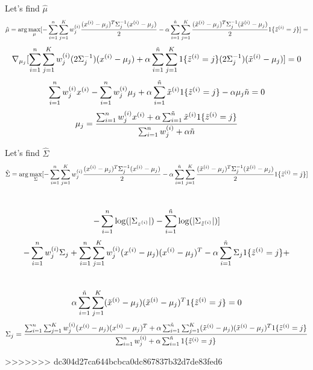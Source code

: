 \begin{answer}
Let's find $\hat{\mu}$
$$\hat{\mu} =  \arg\max_{\mu} [- \sum_{i=1}^{{n}} \sum_{j=1}^{K}  w_j^{(i)} \frac{(x^{(i)} - \mu_j)^T\Sigma_j^{-1}(x^{(i)} - \mu_j)}{2}  - \alpha \sum_{i=1}^{\tilde{{n}}} \sum_{j=1}^{K} \frac{(\tilde{x}^{(i)} - \mu_{j})^T\Sigma_{j}^{-1}(\tilde{x}^{(i)} - \mu_{j})}{2} 1\{\tilde{z}^{(i)}=j\}] = $$
$$\nabla_{\mu_j}[\sum_{i=1}^{{n}} \sum_{j=1}^{K} w_j^{(i)} (2\Sigma_j^{-1}) (x^{(i)} - \mu_j) +\alpha \sum_{i=1}^{\tilde{n}} \sum_{j=1}^{K}  1\{\tilde{z}^{(i)}=j\} (2\Sigma_j^{-1}) (\tilde{x}^{(i)} - \mu_j) ] = 0$$
$$\sum_{i=1}^{{n}} w_j^{(i)} x^{(i)} - \sum_{i=1}^{{n}}  w_j^{(i)} \mu_j +\alpha \sum_{i=1}^{\tilde{n}} \tilde{x}^{(i)} 1\{\tilde{z}^{(i)}=j\}-\alpha \mu_j \tilde{n} = 0$$
$$\mu_j = \frac{\sum_{i=1}^{{n}}  w_j^{(i)} x^{(i)} + \alpha \sum_{i=1}^{\tilde{n}} \tilde{x}^{(i)}1\{\tilde{z}^{(i)}=j\}}{\sum_{i=1}^{{n}} w_j^{(i)} + \alpha \tilde{n}}$$

Let's find $\hat{\Sigma}$
$$\hat{\Sigma} =  \arg\max_{\Sigma} [- \sum_{i=1}^{{n}} \sum_{j=1}^{K}  w_j^{(i)} \frac{(x^{(i)} - \mu_j)^T\Sigma_j^{-1}(x^{(i)} - \mu_j)}{2}  - \alpha \sum_{i=1}^{\tilde{{n}}} \sum_{j=1}^{K} \frac{(\tilde{x}^{(i)} - \mu_{j})^T\Sigma_{j}^{-1}(\tilde{x}^{(i)} - \mu_{j})}{2} 1\{\tilde{z}^{(i)}=j\}]$$ \\
$$ - \sum_{i=1}^{{n}} \log(|\Sigma_{z^{(i)}}|)  - \sum_{i=1}^{\tilde{{n}}} \log(|\Sigma_{\tilde{z}^{(i)}}|)]$$
$$-\sum_{i=1}^{{n}} w_j^{(i)} \Sigma_j + \sum_{i=1}^{{n}} \sum_{j=1}^{K}  w_j^{(i)} (x^{(i)} - \mu_j)(x^{(i)} - \mu_j)^T -  \alpha \sum_{i=1}^{\tilde{{n}}} \Sigma_j 1\{\tilde{z}^{(i)}= j\} +  $$ \\
$$\alpha \sum_{i=1}^{\tilde{{n}}} \sum_{j=1}^{K} (\tilde{x}^{(i)} - \mu_{j})(\tilde{x}^{(i)} - \mu_{j})^T 1\{\tilde{z}^{(i)}=j\}=0$$
$$\Sigma_j = \frac{ \sum_{i=1}^{{n}} \sum_{j=1}^{K}  w_j^{(i)} (x^{(i)} - \mu_j)(x^{(i)} - \mu_j)^T + \alpha \sum_{i=1}^{\tilde{{n}}} \sum_{j=1}^{K} (\tilde{x}^{(i)} - \mu_{j})(\tilde{x}^{(i)} - \mu_{j})^T 1\{\tilde{z}^{(i)}=j\}}{\sum_{i=1}^{{n}} w_j^{(i)} + \alpha \sum_{i=1}^{\tilde{{n}}} 1\{\tilde{z}^{(i)}= j\} }$$


\end{answer}
>>>>>>> dc304d27ca644bcbca0dc867837b32d7de83fed6
